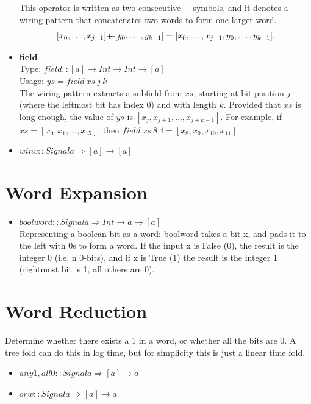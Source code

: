 \documentclass[a4paper,openany,fleqn]{book}
\def\plusplus{\hbox{$+\hskip-0.5em+$}}
\def\plusplus{\hbox{$+\hskip-0.5em+$}}
\begin{document}
\begin{itemize}
  This operator is written as two consecutive + symbols, and it
  denotes a wiring pattern that concatenates two words to form one
  larger word. \[[x_0, \ldots, x_{j-1}] \plusplus [y_0, \ldots,
  y_{k-1}] = [x_0, \ldots, x_{j-1}, y_0, \ldots, y_{k-1}].\]
\item \textbf{field} \\
  Type: $\mathit{field} :: [a] \rightarrow Int \rightarrow Int
  \rightarrow [a]$ \\
  Usage: $\mathit{ys} = \mathit{field}\ \mathit{xs}\ j\ k$ \\
  The wiring pattern extracts a subfield from $\mathit{xs}$, starting
  at bit position $j$ (where the leftmost bit has index 0) and with
  length $k$.  Provided that $\mathit{xs}$ is long enough, the value
  of $\mathit{ys}$ is $[x_j, x_{j+1}, \ldots, x_{j+k-1}]$.  For
  example, if $\mathit{xs} = [x_0, x_1, \ldots, x_{15}]$, then
  $\mathit{field}\ \mathit{xs}\ 8\ 4 = [x_8, x_9, x_{10}, x_{11}]$.
\item $winv :: Signal a \Rightarrow [a] \rightarrow [a]$
\end{itemize}

\section{Word Expansion}
\label{sec:word-expansion}

\begin{itemize}
\item $boolword :: Signal a \Rightarrow Int \rightarrow a \rightarrow [a]$ \\
  Representing a boolean bit as a word: boolword takes a bit x, and
  pads it to the left with 0s to form a word.  If the input x is False
  (0), the result is the integer 0 (i.e. n 0-bits), and if x is True
  (1) the result is the integer 1 (rightmost bit is 1, all others are
  0).
\end{itemize}

\section{Word Reduction}
\label{sec:word-reduction}

Determine whether there exists a 1 in a word, or whether all the bits
are 0.  A tree fold can do this in log time, but for simplicity this
is just a linear time fold.

\begin{itemize}
\item $any1, all0 :: Signal a \Rightarrow [a] \rightarrow a$
\item $orw :: Signal a \Rightarrow [a] \rightarrow a$
\end{itemize}
\end{document}
